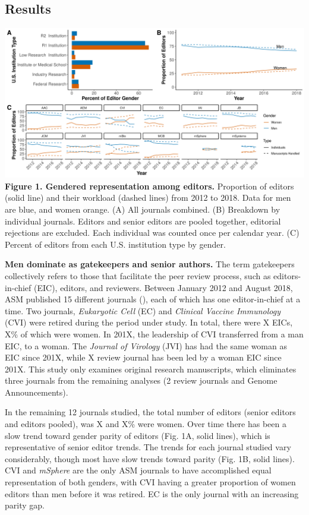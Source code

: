 \documentclass[11pt,]{article}
\begin{document}
\subsection{Results}\label{results}

\includegraphics{Figure_1.png} \textbf{Figure 1. Gendered representation
among editors.} Proportion of editors (solid line) and their workload
(dashed lines) from 2012 to 2018. Data for men are blue, and women
orange. (A) All journals combined. (B) Breakdown by individual journals.
Editors and senior editors are pooled together, editorial rejections are
excluded. Each individual was counted once per calendar year. (C)
Percent of editors from each U.S. institution type by gender.

\textbf{Men dominate as gatekeepers and senior authors.} The term
gatekeepers collectively refers to those that facilitate the peer review
process, such as editors-in-chief (EIC), editors, and reviewers. Between
January 2012 and August 2018, ASM published 15 different journals (),
each of which has one editor-in-chief at a time. Two journals,
\emph{Eukaryotic Cell} (EC) and \emph{Clinical Vaccine Immunology} (CVI)
were retired during the period under study. In total, there were X EICs,
X\% of which were women. In 201X, the leadership of CVI transferred from
a man EIC, to a woman. The \emph{Journal of Virology} (JVI) has had the
same woman as EIC since 201X, while X review journal has been led by a
woman EIC since 201X. This study only examines original research
manuscripts, which eliminates three journals from the remaining analyses
(2 review journals and Genome Announcements).

In the remaining 12 journals studied, the total number of editors
(senior editors and editors pooled), was X and X\% were women. Over time
there has been a slow trend toward gender parity of editors (Fig. 1A,
solid lines), which is representative of senior editor trends. The
trends for each journal studied vary considerably, though most have slow
trends toward parity (Fig. 1B, solid lines). CVI and \emph{mSphere} are
the only ASM journals to have accomplished equal representation of both
genders, with CVI having a greater proportion of women editors than men
before it was retired. EC is the only journal with an increasing parity
gap.
\end{document}
